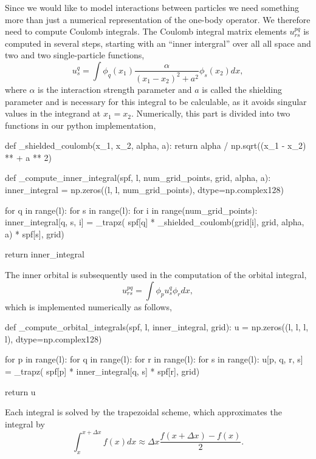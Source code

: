 Since we would like to model interactions between particles we need something more
than just a numerical representation of the one-body operator. We therefore need to 
compute Coulomb integrals. 
The Coulomb integral matrix elements $u^{pq}_{rs}$ is computed in
several steps, starting with an ``inner intergral'' over all all space 
and two and two single-particle functions,
\begin{equation}
   u^q_s = \int \phi_q(x_1) \frac{\alpha}{(x_1-x_2)^2 + a^2}  \phi_s(x_2) dx,
\end{equation}
where $\alpha$ is the interaction strength parameter and $a$ is called the shielding 
parameter and is necessary for this integral 
to be calculable, as it avoids singular values in the integrand at $x_1=x_2$.
Numerically, this part is divided into two functions in our python implementation,
\begin{python}
def _shielded_coulomb(x_1, x_2, alpha, a):
    return alpha / np.sqrt((x_1 - x_2) ** + a ** 2)

def _compute_inner_integral(spf, l, num_grid_points, grid, alpha, a):
    inner_integral = np.zeros((l, l, num_grid_points), dtype=np.complex128)

    for q in range(l):
        for s in range(l):
            for i in range(num_grid_points):
                inner_integral[q, s, i] = _trapz(
                    spf[q]
                    * _shielded_coulomb(grid[i], grid, alpha, a)
                    * spf[s],
                    grid)

    return inner_integral
\end{python}

The inner orbital is subsequently used in the computation of the orbital integral,
\begin{equation}
    u^{pq}_{rs} = \int \phi_p u^q_s \phi_r dx,
\end{equation}
which is implemented numerically as follows,
\begin{python}
def _compute_orbital_integrals(spf, l, inner_integral, grid):
    u = np.zeros((l, l, l, l), dtype=np.complex128)

    for p in range(l):
        for q in range(l):
            for r in range(l):
                for s in range(l):
                    u[p, q, r, s] = _trapz(
                        spf[p] * inner_integral[q, s] * spf[r], grid)

    return u
\end{python}
Each integral is solved by the trapezoidal scheme, which approximates the integral 
by 
\begin{equation}
    \int_x^{x + \Delta x} f(x) dx \approx \Delta x \frac{f(x + \Delta x) - f(x)}{2}.
\end{equation}

